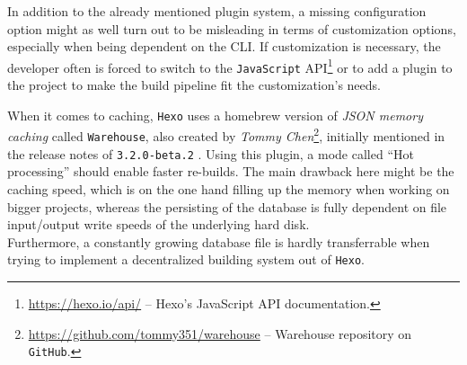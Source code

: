 In addition to the already mentioned plugin system, a missing configuration option might as well turn out to be misleading in terms of customization options, especially when being dependent on the CLI. If customization is necessary, the developer often is forced to switch to the \texttt{JavaScript} API\footnote{\url{https://hexo.io/api/} -- Hexo's JavaScript API documentation.} or to add a plugin to the project to make the build pipeline fit the customization's needs.

When it comes to caching, \texttt{Hexo} uses a homebrew version of \emph{JSON memory caching} called \texttt{Warehouse}, also created by \emph{Tommy Chen}\footnote{\url{https://github.com/tommy351/warehouse} -- Warehouse repository on \texttt{GitHub}.}, initially mentioned in the release notes of \texttt{3.2.0-beta.2} \cite{Chen2015hexorelease}. Using this plugin, a mode called ``Hot processing'' should enable faster re-builds. The main drawback here might be the caching speed, which is on the one hand filling up the memory when working on bigger projects, whereas the persisting of the database is fully dependent on file input/output write speeds of the underlying hard disk.\\
Furthermore, a constantly growing database file is hardly transferrable when trying to implement a decentralized building system out of \texttt{Hexo}.
